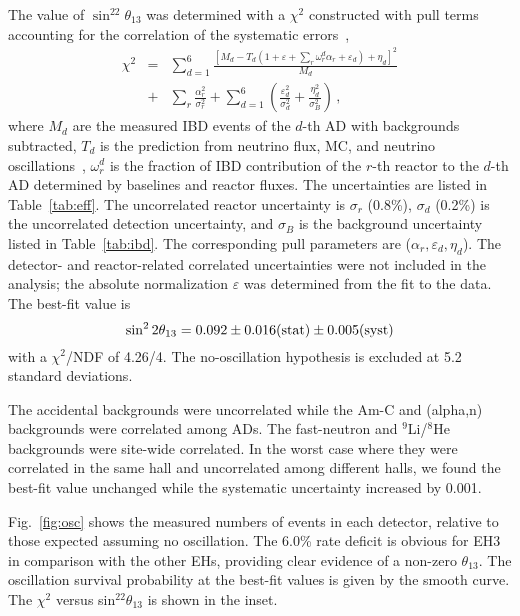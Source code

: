 \documentclass[aps,prl,showpacs,showkeys,amsmath,amssymb,
twocolumn,
floatfix,
superscriptaddress
]{revtex4-1}
\begin{document}
\par
The value of $\sin^22\theta_{13}$ was determined with a $\chi^2$ constructed with pull terms accounting for the correlation of the systematic errors~\cite{stump},
\begin{eqnarray}  \label{eqn:chi2}
 \chi^2 &=&
 \sum_{d=1}^{6}
 \frac{\left[M_d-T_d\left(1+  \varepsilon
 + \sum_r\omega_r^d\alpha_r
 + \varepsilon_d\right) +\eta_d\right]^2}
 {M_d}  \nonumber \\
 &+&
 \sum_r\frac{\alpha_r^2}{\sigma_r^2}
 + \sum_{d=1}^{6} \left(
 \frac{\varepsilon_d^2}{\sigma_d^2}
 + \frac{\eta_d^2}{\sigma_{B}^2}
 \right)
 \,,
\end{eqnarray}
where $M_d$ are the measured IBD events of the $d$-th AD with backgrounds subtracted, $T_d$ is the prediction from neutrino flux, MC, and neutrino oscillations~\cite{fullosc},
$\omega_r^d$ is the fraction of IBD contribution of the $r$-th reactor to the $d$-th AD determined by baselines and reactor fluxes. The uncertainties are listed in Table~\ref{tab:eff}.  The uncorrelated reactor uncertainty is $\sigma_r$ (0.8\%), $\sigma_d$ (0.2\%) is the uncorrelated detection uncertainty, and $\sigma_{B}$ is the background uncertainty listed in Table~\ref{tab:ibd}. The corresponding pull parameters are ($\alpha_r, \varepsilon_d, \eta_d$). The detector- and reactor-related correlated uncertainties were not included in the analysis; the absolute normalization $\varepsilon$ was determined from the fit to the data. The best-fit value is
\begin{equation}
\sin^22\theta_{13}=0.092\pm 0.016({\rm stat})\pm0.005({\rm syst})
\nonumber
\end{equation}
with a $\chi^2$/NDF of 4.26/4. The no-oscillation hypothesis is excluded at 5.2 standard deviations.

\par
The accidental backgrounds were uncorrelated while the Am-C and (alpha,n) backgrounds were correlated among ADs.  The fast-neutron and $^9$Li/$^8$He backgrounds were site-wide correlated. In the worst case where they were correlated in the same hall and uncorrelated among different halls, we found the best-fit value unchanged while the systematic uncertainty increased by 0.001.

\par
Fig.~\ref{fig:osc} shows the measured numbers of events in each detector, relative to those expected assuming no oscillation. The 6.0\% rate deficit is obvious for EH3 in comparison with the other EHs, providing clear evidence of a non-zero $\theta_{13}$.  The oscillation survival probability at the
best-fit values is given by the smooth curve.  The $\chi^2$
versus sin$^22\theta_{13}$ is shown in the inset.
\end{document}
